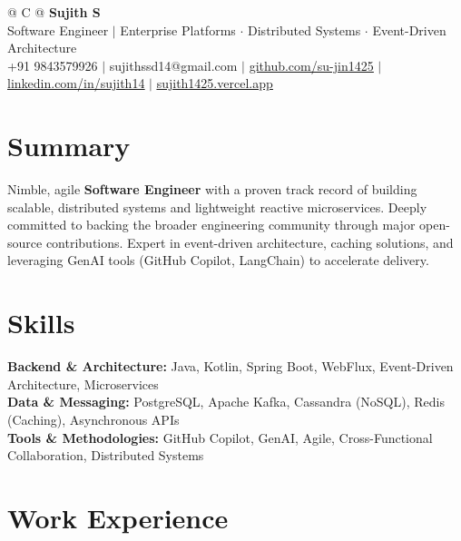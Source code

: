 \documentclass[a4paper,10pt]{article}
\newcommand{\ulink}[2]{\href{#1}{\uline{#2}}}
\begin{document}
\pagestyle{empty}

\begin{tabularx}{\linewidth}{@{} C @{}}
{\color[HTML]{000000}\fontsize{30}{35}\selectfont\bfseries Sujith S} \\[5pt]
{\fontsize{10.5}{12.5}\selectfont\color[HTML]{3A3A3A}
Software Engineer $|$ Enterprise Platforms $\cdot$ Distributed Systems $\cdot$ Event-Driven Architecture} \\[6pt]
{\fontsize{9.5}{11.5}\selectfont\textcolor[HTML]{3A3A3A}{+91 9843579926 $|$ sujithssd14@gmail.com $|$ \ulink{https://github.com/su-jin1425}{github.com/su-jin1425} $|$ \ulink{https://linkedin.com/in/sujith14}{linkedin.com/in/sujith14} $|$ \ulink{https://sujith1425.vercel.app}{sujith1425.vercel.app}}}
\end{tabularx}

\section{Summary}
\vspace{2pt}

{\color[HTML]{0A0A0A}\fontsize{11}{14}\selectfont
Nimble, agile \textbf{Software Engineer} with a proven track record of building scalable, distributed systems and lightweight reactive microservices. Deeply committed to backing the broader engineering community through major open-source contributions. Expert in event-driven architecture, caching solutions, and leveraging GenAI tools (GitHub Copilot, LangChain) to accelerate delivery.}

\section{Skills}
\vspace{2pt}

{\color[HTML]{0A0A0A}\fontsize{11}{14}\selectfont
\textbf{Backend \& Architecture:} Java, Kotlin, Spring Boot, WebFlux, Event-Driven Architecture, Microservices \\[2pt]
\textbf{Data \& Messaging:} PostgreSQL, Apache Kafka, Cassandra (NoSQL), Redis (Caching), Asynchronous APIs \\[2pt]
\textbf{Tools \& Methodologies:} GitHub Copilot, GenAI, Agile, Cross-Functional Collaboration, Distributed Systems}

\section{Work Experience}
\vspace{2pt}
\end{document}
